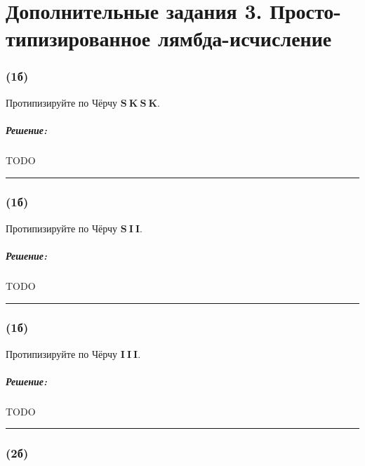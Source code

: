 \documentclass{article}
\newenvironment{proof}{\subparagraph{\hspace{-1em}Решение:\newline}}{\par\noindent\rule{\textwidth}{0.4pt}}
\begin{document}
    \section*{Дополнительные задания 3. Просто-типизированное лямбда-исчисление}

    \subsubsection{(1б)}

    Протипизируйте по Чёрчу $\mathbf{S}~\mathbf{K}~\mathbf{S}~\mathbf{K}$.

    \begin{proof}
        TODO %
    \end{proof}

    \subsubsection{(1б)}

    Протипизируйте по Чёрчу $\mathbf{S}~\mathbf{I}~\mathbf{I}$.

    \begin{proof}
        TODO %
    \end{proof}

    \subsubsection{(1б)}

    Протипизируйте по Чёрчу $\mathbf{I}~\mathbf{I}~\mathbf{I}$.

    \begin{proof}
        TODO %
    \end{proof}

    \subsubsection{(2б)}
\end{document}
